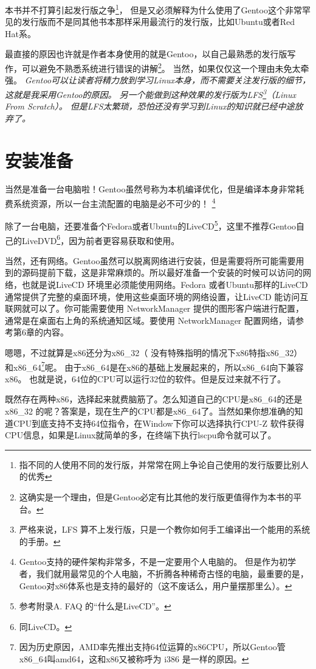 \documentclass[amstex]{ctexbook}
\begin{document}
本书并不打算引起发行版之争\footnote{指不同的人使用不同的发行版，并常常在网上争论自己使用的发行版要比别人的优秀}，
但是又必须解释为什么使用了Gentoo这个非常罕见的发行版而不是同其他书本那样采用最流行的发行版，比如Ubuntu或者Red Hat系。

最直接的原因也许就是作者本身使用的就是Gentoo，以自己最熟悉的发行版写作，可以避免不熟悉系统进行错误的讲解\footnote{这确实是一个理由，但是Gentoo必定有比其他的发行版更值得作为本书的平台。}。
当然，如果仅仅这一个理由未免太牵强。
\it
Gentoo可以让读者将精力放到学习Linux本身，而不需要关注发行版的细节，这就是我采用Gentoo的原因。
\normalfont
另一个能做到这种效果的发行版为LFS\footnote{严格来说，LFS 算不上发行版，只是一个教你如何手工编译出一个能用的系统的手册。}（Linux From Scratch）。
但是LFS太繁琐，恐怕还没有学习到Linux的知识就已经中途放弃了。


\section{安装准备}

当然是准备一台电脑啦！Gentoo虽然号称为本机编译优化，但是编译本身非常耗费系统资源，所以一台主流配置的电脑是必不可少的！
\footnote{Gentoo支持的硬件架构非常多，不是一定要用个人电脑的。
但是作为初学者，我们就用最常见的个人电脑，不折腾各种稀奇古怪的电脑，最重要的是，Gentoo对x86体系也是支持的最好的（这不废话么，用户量摆那里么）。}


除了一台电脑，还要准备个Fedora或者Ubuntu的LiveCD\footnote{参考附录A. FAQ 的“什么是LiveCD”。
}，这里不推荐Gentoo自己的LiveDVD\footnote{同LiveCD。}，因为前者更容易获取和使用。

当然，还有网络。Gentoo虽然可以脱离网络进行安装，但是需要将所可能需要用到的源码提前下载，这是非常麻烦的。所以最好准备一个安装的时候可以访问的网络，也就是说LiveCD 环境里必须能使用网络。Fedora 或者Ubuntu那样的LiveCD 通常提供了完整的桌面环境，使用这些桌面环境的网络设置，让LiveCD 能访问互联网就可以了。你可能需要使用 NetworkManager 提供的图形客户端进行配置，通常是在桌面右上角的系统通知区域。要使用 NetworkManager 配置网络，请参考第6章的内容。

嗯嗯，不过就算是x86还分为x86\_32（ 没有特殊指明的情况下x86特指x86\_32） 和x86\_64\footnote{因为历史原因，AMD率先推出支持64位运算的x86CPU，所以Gentoo管x86\_64叫amd64，这和x86又被称呼为 i386 是一样的原因。}呢。
由于x86\_64是在x86的基础上发展起来的，所以x86\_64向下兼容x86。 也就是说，64位的CPU可以运行32位的软件。但是反过来就不行了。

既然存在两种x86，选择起来就费脑筋了。怎么知道自己的CPU是x86\_64的还是x86\_32 的呢？答案是，现在生产的CPU都是x86\_64了。当然如果你想准确的知道CPU到底支持不支持64位指令，在Window下你可以选择执行CPU-Z 软件获得CPU信息，如果是Linux就简单的多，在终端下执行lscpu命令就可以了。
\end{document}
